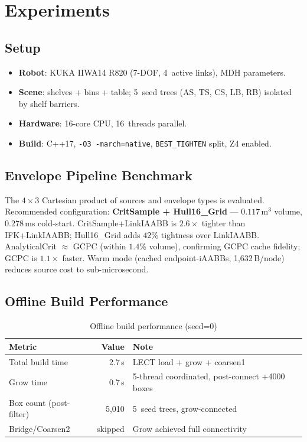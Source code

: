 \documentclass[journal]{IEEEtran}
\begin{document}
\section{Experiments}\label{sec:experiments}

\subsection{Setup}

\begin{itemize}[nosep]
  \item \textbf{Robot}: KUKA IIWA14 R820 (7-DOF, 4~active links),
    MDH parameters.
  \item \textbf{Scene}: shelves + bins + table; 5~seed trees
    (AS, TS, CS, LB, RB) isolated by shelf barriers.
  \item \textbf{Hardware}: 16-core CPU, 16~threads parallel.
  \item \textbf{Build}: C++17, \texttt{-O3 -march=native},
    \texttt{BEST\_TIGHTEN} split, Z4 enabled.
\end{itemize}

\subsection{Envelope Pipeline Benchmark}

The $4{\times}3$ Cartesian product of sources and envelope types is
evaluated.
Recommended configuration:
\textbf{CritSample + Hull16\_Grid} --- $0.117\,$m$^3$ volume,
$0.278\,$ms cold-start.
CritSample+LinkIAABB is $2.6{\times}$ tighter than IFK+LinkIAABB;
Hull16\_Grid adds $42\%$ tightness over LinkIAABB.
AnalyticalCrit $\approx$ GCPC (within $1.4\%$ volume), confirming
GCPC cache fidelity; GCPC is $1.1{\times}$ faster.
Warm mode (cached endpoint-iAABBs, 1{,}632\,B/node) reduces source
cost to sub-microsecond.

\subsection{Offline Build Performance}

\begin{table}[ht]
\centering
\caption{Offline build performance (seed=0)}
\label{tab:build}
\begin{tabular}{@{}lrl@{}}
\toprule
\textbf{Metric} & \textbf{Value} & \textbf{Note} \\
\midrule
Total build time & 2.7\,s & LECT load + grow + coarsen1 \\
Grow time & 0.7\,s & 5-thread coordinated, post-connect +4000 boxes \\
Box count (post-filter) & 5{,}010 & 5~seed trees, grow-connected \\
Bridge/Coarsen2 & skipped & Grow achieved full connectivity \\
\bottomrule
\end{tabular}
\end{table}
\end{document}
